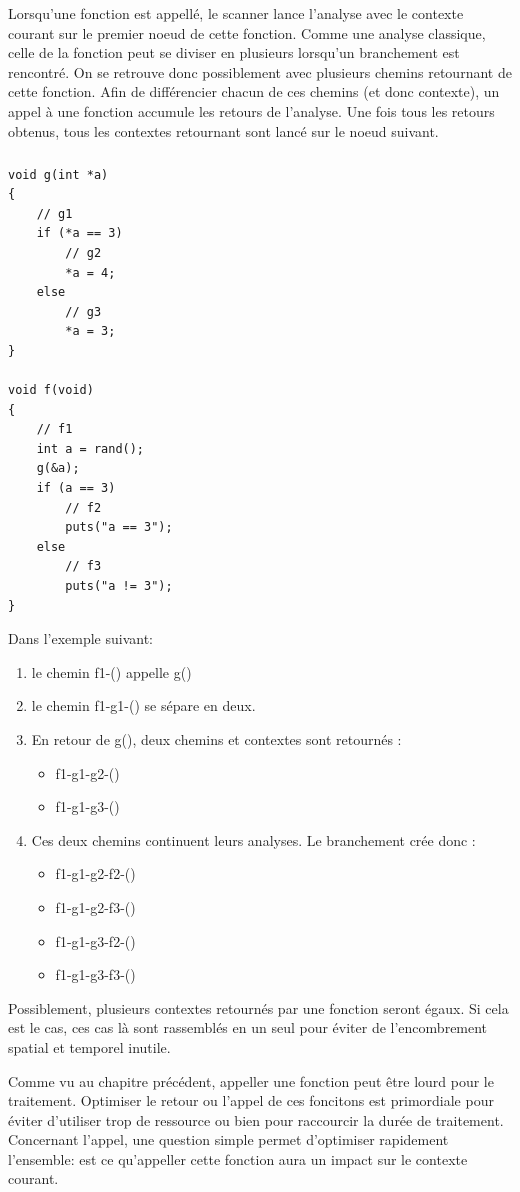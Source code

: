 Lorsqu'une fonction est appellé, le scanner lance l'analyse avec le contexte courant sur le premier noeud de cette fonction. Comme une analyse classique, celle de la fonction peut se diviser
en plusieurs lorsqu'un branchement est rencontré. On se retrouve donc possiblement avec plusieurs chemins retournant de cette fonction. Afin de différencier chacun de ces chemins (et donc contexte),
un appel à une fonction accumule les retours de l'analyse. Une fois tous les retours obtenus, tous les contextes retournant sont lancé sur le noeud suivant.
\subparagraph{}
\begin {lstlisting}[frame=single]
void g(int *a)
{
    // g1
    if (*a == 3)
        // g2
        *a = 4;
    else
        // g3
        *a = 3;
}

void f(void)
{
    // f1
    int a = rand();
    g(&a);
    if (a == 3)
        // f2
        puts("a == 3");
    else
        // f3
        puts("a != 3");
}
\end{lstlisting}
Dans l'exemple suivant:
\begin{enumerate}
    \item le chemin f1-() appelle g()
    \item le chemin f1-g1-() se sépare en deux.
    \item En retour de g(), deux chemins et contextes sont retournés :
    \begin{itemize}
        \item f1-g1-g2-()
        \item f1-g1-g3-()
    \end{itemize}
    \item Ces deux chemins continuent leurs analyses. Le branchement crée donc :
            \begin{itemize}
                \item f1-g1-g2-f2-()
                \item f1-g1-g2-f3-()
                \item f1-g1-g3-f2-()
                \item f1-g1-g3-f3-()
            \end{itemize}
\end{enumerate}
Possiblement, plusieurs contextes retournés par une fonction seront égaux. Si cela est le cas,
ces cas là sont rassemblés en un seul pour éviter de l'encombrement spatial et temporel inutile.

Comme vu au chapitre précédent, appeller une fonction peut être lourd pour le traitement. Optimiser le retour
ou l'appel de ces foncitons est primordiale pour éviter d'utiliser trop de ressource ou bien pour raccourcir la durée de traitement.
Concernant l'appel, une question simple permet d'optimiser rapidement l'ensemble: est ce qu'appeller cette fonction aura un impact sur le contexte courant.

